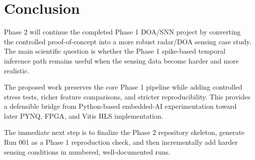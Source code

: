 \section{Conclusion}

Phase 2 will continue the completed Phase 1 DOA/SNN project by converting the controlled proof-of-concept into a more robust radar/DOA sensing case study. The main scientific question is whether the Phase 1 spike-based temporal inference path remains useful when the sensing data become harder and more realistic.

The proposed work preserves the core Phase 1 pipeline while adding controlled stress tests, richer feature comparisons, and stricter reproducibility. This provides a defensible bridge from Python-based embedded-AI experimentation toward later PYNQ, FPGA, and Vitis HLS implementation.

The immediate next step is to finalize the Phase 2 repository skeleton, generate Run 001 as a Phase 1 reproduction check, and then incrementally add harder sensing conditions in numbered, well-documented runs.
